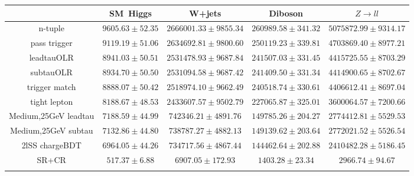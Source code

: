 \centering
\begin{tabular}{ccccc} \toprule\toprule
 & SM~Higgs & W+jets & Diboson & $Z\to ll$\\\midrule
n-tuple & $9605.63\pm52.35$ & $2666001.33\pm9855.34$ & $260989.58\pm341.32$ & $5075872.99\pm9314.17$\\
pass trigger & $9119.19\pm51.06$ & $2634692.81\pm9800.60$ & $250119.23\pm339.81$ & $4703869.40\pm8977.21$\\
leadtauOLR & $8941.03\pm50.51$ & $2531478.93\pm9687.84$ & $241507.03\pm331.45$ & $4415725.55\pm8703.29$\\
subtauOLR & $8934.70\pm50.50$ & $2531094.58\pm9687.42$ & $241409.50\pm331.34$ & $4414900.65\pm8702.67$\\
trigger match & $8888.07\pm50.42$ & $2518974.10\pm9662.49$ & $240518.74\pm330.61$ & $4406612.41\pm8697.04$\\
tight lepton & $8188.67\pm48.53$ & $2433607.57\pm9502.79$ & $227065.87\pm325.01$ & $3600064.57\pm7200.66$\\
Medium,25GeV leadtau & $7188.59\pm44.99$ & $742346.21\pm4891.76$ & $149785.26\pm204.27$ & $2774412.81\pm5529.53$\\
Medium,25GeV subtau & $7132.86\pm44.80$ & $738787.27\pm4882.13$ & $149139.62\pm203.64$ & $2772021.52\pm5526.54$\\
2lSS chargeBDT & $6964.05\pm44.26$ & $734717.56\pm4867.44$ & $144462.64\pm202.88$ & $2410482.28\pm5186.45$\\
SR+CR & $517.37\pm6.88$ & $6907.05\pm172.93$ & $1403.28\pm23.34$ & $2966.74\pm94.67$\\
\bottomrule\bottomrule\\
\end{tabular}
